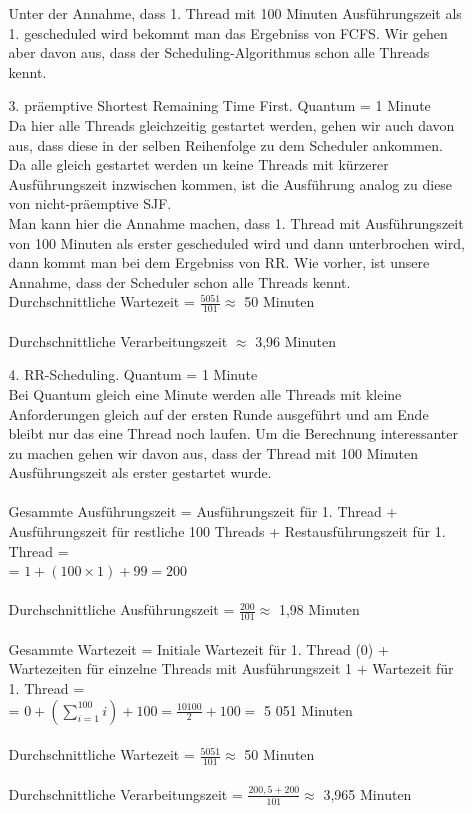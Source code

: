 \begin{enumerate}
\begin{enumerate}
Unter der Annahme, dass 1. Thread mit 100 Minuten Ausführungszeit als 1. gescheduled wird bekommt man das Ergebniss von FCFS. Wir gehen aber davon aus, dass der Scheduling-Algorithmus schon alle Threads kennt.

\item[3. ] präemptive Shortest Remaining Time First. Quantum = 1 Minute \\
Da hier alle Threads gleichzeitig gestartet werden, gehen wir auch davon aus, dass diese in der selben Reihenfolge zu dem Scheduler ankommen. Da alle gleich gestartet werden un keine Threads mit kürzerer Ausführungszeit inzwischen kommen, ist die Ausführung analog zu diese von nicht-präemptive SJF. \\

Man kann hier die Annahme machen, dass 1. Thread mit Ausführungszeit von 100 Minuten als erster gescheduled wird und dann unterbrochen wird, dann kommt man bei dem Ergebniss von RR. Wie vorher, ist unsere Annahme, dass der Scheduler schon alle Threads kennt. \\

Durchschnittliche Wartezeit = $\frac{5051}{101} \approx $ 50 Minuten \\ \\
Durchschnittliche Verarbeitungszeit $\approx$ 3,96 Minuten \\ 

\item[4. ] RR-Scheduling. Quantum = 1 Minute \\
Bei Quantum gleich eine Minute werden alle Threads mit kleine Anforderungen gleich auf der ersten Runde ausgeführt und am Ende bleibt nur das eine Thread noch laufen. Um die Berechnung interessanter zu machen gehen wir davon aus, dass der Thread mit 100 Minuten Ausführungszeit als erster gestartet wurde.\\ \\
%
Gesammte Ausführungszeit = Ausführungszeit für 1. Thread + Ausführungszeit für restliche 100 Threads + Restausführungszeit für 1. Thread = \\
= $1 + (100 \times 1) + 99 = 200 $ \\ \\
Durchschnittliche Ausführungszeit = $\frac{200}{101} \approx $ 1,98 Minuten \\ \\
Gesammte Wartezeit = Initiale Wartezeit für 1. Thread (0) + Wartezeiten für einzelne Threads mit Ausführungszeit 1 + Wartezeit für 1. Thread = \\
= $ 0 + (\sum_{i=1}^{100} i) + 100 =  \frac{10100}{2} + 100 =  $ 5 051 Minuten \\ \\
Durchschnittliche Wartezeit = $\frac{5051}{101} \approx $ 50 Minuten \\ \\
Durchschnittliche Verarbeitungszeit = $\frac{200,5 + 200}{101} \approx $ 3,965 Minuten 



\end{enumerate}
\end{enumerate}
